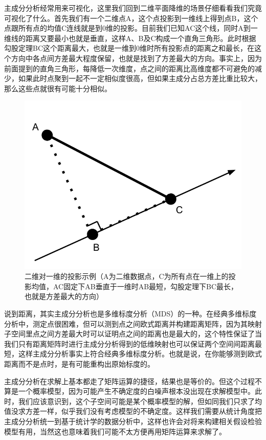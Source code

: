 \documentclass[]{tufte-book}
\begin{document}
主成分分析经常用来可视化，这里我们回到二维平面降维的场景仔细看看我们究竟可视化了什么。首先我们有一个二维点A，这个点投影到一维线上得到点B，这个点跟所有点的均值C连线就是到0维的投影。目前我们已知AC这个线，同时A到一维线的距离又要最小也就是垂直，这样A、B及C构成一个直角三角形。此时根据勾股定理BC这个距离最大，也就是一维到0维时所有投影点的距离之和最长，在这个方向中各点间方差最大程度保留，也就是找到了方差最大的方向。事实上，因为前面提到的直角三角形，每降低一次维度，点之间的距离比高维度都不可避免的减少，如果此时点聚到一起不一定相似度很高，但如果主成分占总方差比重比较大，那么这些点就很有可能十分相似。

\begin{figure}
\includegraphics{data/PCA} \caption[二维对一维的投影示例（A为二维数据点，C为所有点在一维上的投影均值，AC固定下AB垂直于一维时AB最短，勾股定理下BC最长，也就是方差最大的方向）]{二维对一维的投影示例（A为二维数据点，C为所有点在一维上的投影均值，AC固定下AB垂直于一维时AB最短，勾股定理下BC最长，也就是方差最大的方向）}\label{fig:unnamed-chunk-33}
\end{figure}

说到距离，其实主成分分析也是多维标度分析（MDS）的一种。在经典多维标度分析中，测定点很困难，但可以测到点之间欧式距离并构建距离矩阵，因为其映射子空间里点之间方差最大时可以证明点之间的距离也是最大的，这个特性保证了当我们只有距离矩阵时进行主成分分析得到的低维映射也可以保证两个空间间距离最短，这样主成分分析事实上符合经典多维标度分析。也就是说，在你能够测到欧式距离而不是点时，是有可能重构出原始标度的。

主成分分析在求解上基本都走了矩阵运算的捷径，结果也是等价的。但这个过程不算是一个概率模型，因为可能产生不确定度的白噪声根本没出现在求解模型中。此时，我们应该意识到，这个子空间可能是某个概率模型的解，但如同我们只求了均值没求方差一样，似乎我们没有考虑模型的不确定度。这样我们需要从统计角度把主成分分析统一到基于统计学的数据分析中，这样也许会对将来构建相关假设检验模型有用，当然这也意味着我们可能不太方便再用矩阵运算来求解了。
\end{document}
